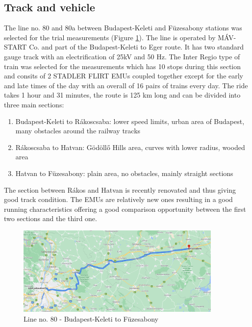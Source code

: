 \documentclass{article}
\begin{document}
		\subsection{Track and vehicle}
			The line no. 80 and 80a between Budapest-Keleti and Füzesabony stations was selected for the trial measurements (Figure \ref{fig:line_no80}). The line is operated by MÁV-START Co. and part of the Budapest-Keleti to Eger route. It has two standard gauge track with an electrification of 25kV and 50 Hz. The Inter Regio type of train was selected for the measurements which has 10 stops during this section and consits of 2 STADLER FLIRT EMUs coupled together except for the early and late times of the day with an overall of 16 pairs of trains every day. The ride takes 1 hour and 31 minutes, the route is 125 km long and can be divided into three main sections:
			\begin{enumerate}
				\item Budapest-Keleti to Rákoscsaba: lower speed limits, urban area of Budapest, many obstacles around the railway tracks
				\item Rákoscsaba to Hatvan: Gödöllő Hills area, curves with lower radius, wooded area
				\item Hatvan to Füzesabony: plain area, no obstacles, mainly straight sections
			\end{enumerate}
			The section between Rákos and Hatvan is recently renovated and thus giving good track condition. The EMUs are relatively new ones resulting in a good running characteristics offering a good comparison opportunity between the first two sections and the third one.
			\begin{figure}[h]
				\centering
				\includegraphics[width=0.9\textwidth]{line_no80.png}
				\caption{Line no. 80 - Budapest-Keleti to Füzesabony}
				\label{fig:line_no80}
			\end{figure}
\end{document}
